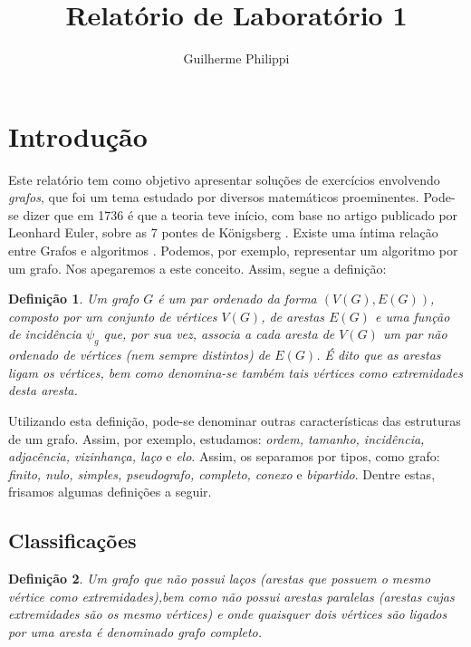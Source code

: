 \documentclass[a4paper,12pt]{article}
\title{Relatório de Laboratório 1}
\author{Guilherme Philippi}
\newtheorem{definicao}{Definição}[section]
\begin{document}
\maketitle
\tableofcontents

\section{Introdução}

Este relatório tem como objetivo apresentar soluções de exercícios envolvendo \textit{grafos}, que foi um tema estudado por diversos matemáticos proeminentes. Pode-se dizer que em 1736 é que a teoria teve início, com base no artigo publicado por Leonhard Euler, sobre as 7 pontes de Königsberg \cite{grafos1}. Existe uma íntima relação entre Grafos e algoritmos \cite{grafos0}. Podemos, por exemplo, representar um algoritmo por um grafo. Nos apegaremos a este conceito. Assim, segue a definição:

\begin{definicao}
	Um grafo $G$ é um par ordenado da forma $(V(G),E(G))$, composto por um conjunto de \textit{vértices} $V(G)$, de arestas $E(G)$ e uma \textit{função de incidência} $\psi_{g}$ que, por sua vez, associa a cada aresta de $V(G)$ um par não ordenado de vértices (nem sempre distintos) de $E(G)$. É dito que as arestas \textit{ligam} os vértices, bem como denomina-se também tais vértices como \textit{extremidades} desta aresta.
\end{definicao}

Utilizando esta definição, pode-se denominar outras características das estruturas de um grafo. Assim, por exemplo, estudamos: \textit{ordem, tamanho, incidência, adjacência, vizinhança, laço} e \textit{elo}. Assim, os separamos por tipos, como grafo: \textit{finito, nulo, simples, pseudografo, completo, conexo} e \textit{bipartido}. Dentre estas, frisamos algumas definições a seguir.

\subsection{Classificações}

\begin{definicao}
	Um grafo que não possui laços (arestas que possuem o mesmo vértice como extremidades),bem como não possui arestas paralelas (arestas cujas extremidades são os mesmo vértices) e onde quaisquer dois vértices são ligados por uma aresta é denominado \textit{grafo completo}.
\end{definicao}
\end{document}

